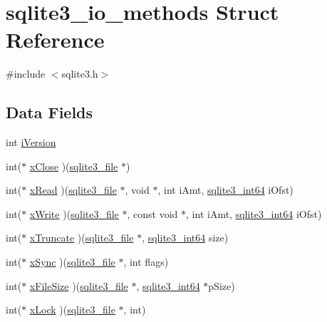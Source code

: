 \hypertarget{structsqlite3__io__methods}{}\section{sqlite3\+\_\+io\+\_\+methods Struct Reference}
\label{structsqlite3__io__methods}


{\ttfamily \#include $<$sqlite3.\+h$>$}

\subsection*{Data Fields}
\begin{DoxyCompactItemize}
\item 
int \hyperlink{structsqlite3__io__methods_a1138620d71393e6105389670719d9685}{i\+Version}
\item 
int($\ast$ \hyperlink{structsqlite3__io__methods_a38f9e3ecb6bc5ed12f45fca5d85344c8}{x\+Close} )(\hyperlink{structsqlite3__file}{sqlite3\+\_\+file} $\ast$)
\item 
int($\ast$ \hyperlink{structsqlite3__io__methods_afd9c9bd674df251d9fc83fe3c9264e49}{x\+Read} )(\hyperlink{structsqlite3__file}{sqlite3\+\_\+file} $\ast$, void $\ast$, int i\+Amt, \hyperlink{sqlite3_8c_a0a4d3e6c1ad46f90e746b920ab6ca0d2}{sqlite3\+\_\+int64} i\+Ofst)
\item 
int($\ast$ \hyperlink{structsqlite3__io__methods_ada19091e7f4ffc5accb40e38d001a801}{x\+Write} )(\hyperlink{structsqlite3__file}{sqlite3\+\_\+file} $\ast$, const void $\ast$, int i\+Amt, \hyperlink{sqlite3_8c_a0a4d3e6c1ad46f90e746b920ab6ca0d2}{sqlite3\+\_\+int64} i\+Ofst)
\item 
int($\ast$ \hyperlink{structsqlite3__io__methods_a206ff66f685638f41a052036912f3303}{x\+Truncate} )(\hyperlink{structsqlite3__file}{sqlite3\+\_\+file} $\ast$, \hyperlink{sqlite3_8c_a0a4d3e6c1ad46f90e746b920ab6ca0d2}{sqlite3\+\_\+int64} size)
\item 
int($\ast$ \hyperlink{structsqlite3__io__methods_a66cbb6be226b7c7a09d2f3c43a9f95b5}{x\+Sync} )(\hyperlink{structsqlite3__file}{sqlite3\+\_\+file} $\ast$, int flags)
\item 
int($\ast$ \hyperlink{structsqlite3__io__methods_ab64f72852b709be630716b073ee18d81}{x\+File\+Size} )(\hyperlink{structsqlite3__file}{sqlite3\+\_\+file} $\ast$, \hyperlink{sqlite3_8c_a0a4d3e6c1ad46f90e746b920ab6ca0d2}{sqlite3\+\_\+int64} $\ast$p\+Size)
\item 
int($\ast$ \hyperlink{structsqlite3__io__methods_aa2fca6e81fd5d6a66a0d301014634e8c}{x\+Lock} )(\hyperlink{structsqlite3__file}{sqlite3\+\_\+file} $\ast$, int)

\end{DoxyCompactItemize}

